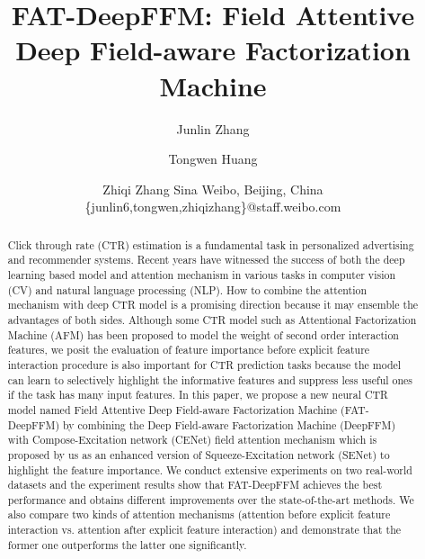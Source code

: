 \documentclass{article}
\title{FAT-DeepFFM: Field Attentive Deep Field-aware Factorization Machine}
\author{
Junlin Zhang
\and
Tongwen Huang
\and
Zhiqi Zhang
\affiliations
Sina Weibo, Beijing, China
\emails
\{junlin6,tongwen,zhiqizhang\}@staff.weibo.com
}
\begin{document}
\maketitle

\begin{abstract}
Click through rate (CTR) estimation is a fundamental task in personalized advertising and recommender systems. Recent years have witnessed the success of both the deep learning based model and attention mechanism in various tasks in computer vision (CV) and natural language processing (NLP). How to combine the attention mechanism with deep CTR model is a promising direction because it may ensemble the advantages of both sides. Although some CTR model such as Attentional Factorization Machine (AFM) has been proposed to model the weight of second order interaction features, we posit the evaluation of feature importance before explicit feature interaction procedure is also important for CTR prediction tasks because the model can learn to selectively highlight the informative features and suppress less useful ones if the task has many input features. In this paper, we propose a new neural CTR model named Field Attentive Deep Field-aware Factorization Machine (FAT-DeepFFM) by combining the Deep Field-aware Factorization Machine (DeepFFM) with Compose-Excitation network (CENet) field attention mechanism which is proposed by us as an enhanced version of Squeeze-Excitation network (SENet) to highlight the feature importance. We conduct extensive experiments on two real-world datasets and the experiment results show that FAT-DeepFFM achieves the best performance and obtains different improvements over the state-of-the-art methods. We also compare two kinds of attention mechanisms (attention before explicit feature interaction vs. attention after explicit feature interaction) and demonstrate that the former one outperforms the latter one significantly.
\end{abstract}
\end{document}
